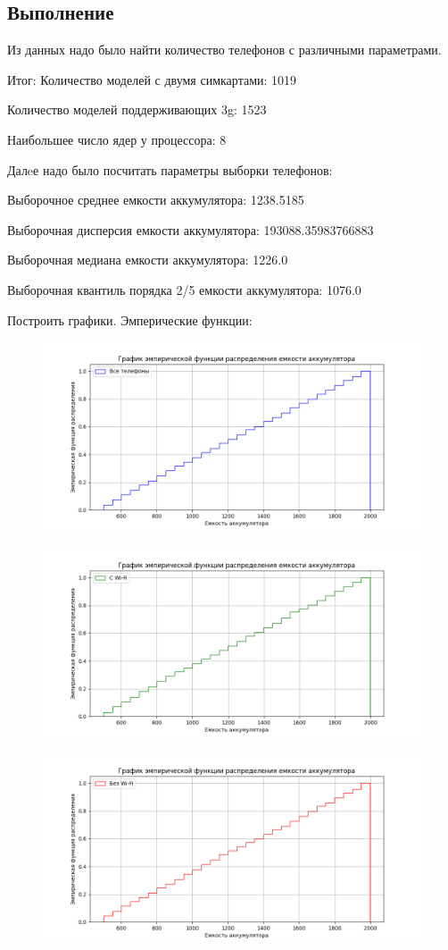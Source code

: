 \documentclass{article}
\begin{document}
\subsection{Выполнение}\label{subsec:2}
Из данных надо было найти количество телефонов с различными параметрами.

Итог:
Количество моделей с двумя симкартами: 1019

Количество моделей поддерживающих 3g: 1523

Наибольшее число ядер у процессора: 8

Далeе надо было посчитать параметры выборки телефонов:

Выборочное среднее емкости аккумулятора: 1238.5185

Выборочная дисперсия емкости аккумулятора: 193088.35983766883

Выборочная медиана емкости аккумулятора: 1226.0

Выборочная квантиль порядка 2/5 емкости аккумулятора: 1076.0

Построить графики.
Эмперические функции:
\begin{figure}[H]
      \centering
      \includegraphics[width=0.5\linewidth]{Python/emper-all-phones}\label{fig:figure4}
\end{figure}

\begin{figure}[H]
      \centering
      \includegraphics[width=0.5\linewidth]{Python/emper-wi-fi}\label{fig:figure5}
\end{figure}

\begin{figure}[H]
      \centering
      \includegraphics[width=0.5\linewidth]{Python/emper-without-wifi}\label{fig:figure6}
\end{figure}
\end{document}
